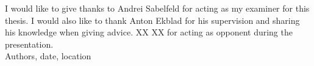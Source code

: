 \thispagestyle{empty}

\begin{acknowledgements}
I would like to give thanks to Andrei Sabelfeld for acting as my examiner for this thesis. I would also like to thank Anton Ekblad for his supervision and sharing his knowledge when giving advice. XX XX for acting as opponent during the presentation. \\[1cm]

\hfill Authors, date, location
\end{acknowledgements}
